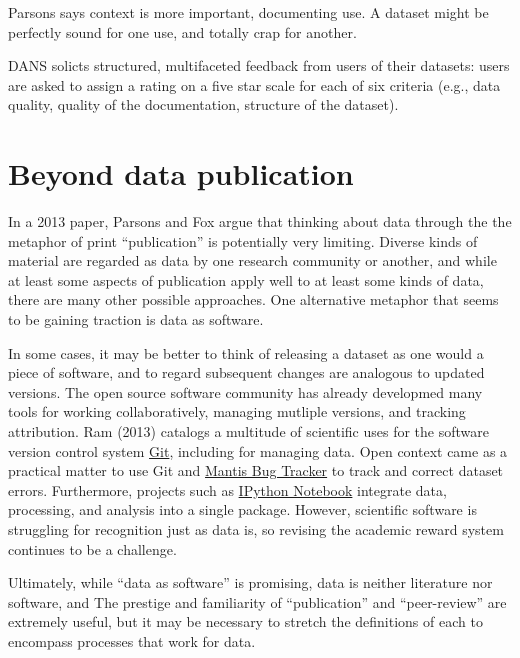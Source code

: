 \documentclass[10pt,twocolumn]{article}
\begin{document}
Parsons says context is more important, documenting use.
A dataset might be perfectly sound for one use, and totally crap for another.

DANS solicts structured, multifaceted feedback from users of their datasets: users are asked to assign a rating on a five star scale for each of six criteria (e.g., data quality, quality of the documentation, structure of the dataset).\cite{grootveld_data_2011,grootveld_peer-reviewed_2012}


\section*{Beyond data publication}\label{beyond-data-publication}

In a 2013 paper\cite{parsons_is_2013}, Parsons and Fox argue that thinking about data through the the metaphor of print ``publication'' is potentially very limiting.
Diverse kinds of material are regarded as data by one research community or another, and while at least some aspects of publication apply well to at least some kinds of data, there are many other possible approaches.
One alternative metaphor that seems to be gaining traction is data as software.\cite{schopf_treating_2012}

In some cases, it may be better to think of releasing a dataset as one would a piece of software, and to regard subsequent changes are analogous to updated versions.
The open source software community has already developmed many tools for working collaboratively, managing mutliple versions, and tracking attribution.
Ram (2013)\cite{ram_git_2013} catalogs a multitude of scientific uses for the software version control system \href{http://git-scm.com/}{Git}, including for managing data.
Open context came as a practical matter to use Git and \href{http://www.mantisbt.org/}{Mantis Bug Tracker} to track and correct dataset errors.
Furthermore, projects such as \href{http://ipython.org/notebook}{IPython Notebook} integrate data, processing, and analysis into a single package.
However, scientific software is struggling for recognition\cite{pradal_publishing_2013} just as data is, so revising the academic reward system continues to be a challenge.

Ultimately, while ``data as software'' is promising, data is neither literature nor software, and
The prestige and familiarity of ``publication'' and ``peer-review'' are extremely useful, but it may be necessary to stretch the definitions of each to encompass processes that work for data.
\end{document}
